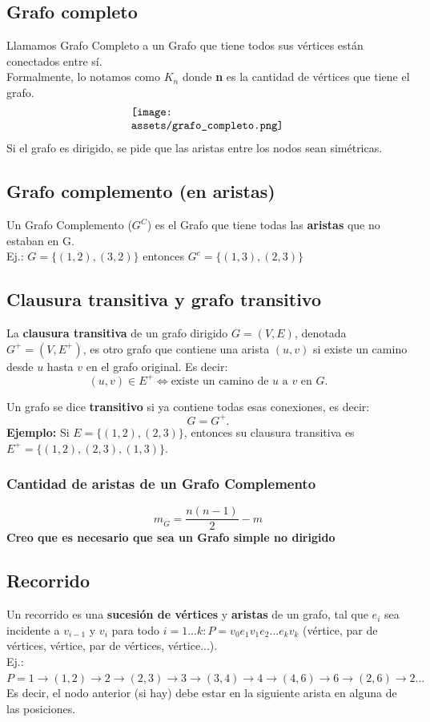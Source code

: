 \documentclass[10pt,a4paper]{article}
\begin{document}
\subsection*{Grafo completo}
Llamamos Grafo Completo a un Grafo que tiene todos sus vértices están conectados entre sí. \\
Formalmente, lo notamos como $K_{n}$ donde \textbf{n} es la cantidad de vértices que tiene el grafo.
\[\begin{minipage}[b]{0.4\textwidth} 
    \texttt{[image: assets/grafo\_completo.png]}
\end{minipage}\]
Si el grafo es dirigido, se pide que las aristas entre los nodos sean simétricas.
\subsection*{Grafo complemento (en aristas)}
Un Grafo Complemento ($G^{C}$) es el Grafo que tiene todas las \textbf{aristas} que no estaban en G. \\
Ej.: $G = \{(1, 2), (3, 2)\}$ entonces $ G^{c} = \{(1, 3), (2, 3)\}$
\subsection*{Clausura transitiva y grafo transitivo}

La \textbf{clausura transitiva} de un grafo dirigido \(G = (V, E)\), denotada \(G^+ = (V, E^+)\), es otro grafo que contiene una arista \((u,v)\) si existe un camino desde \(u\) hasta \(v\) en el grafo original. Es decir:
\[
(u,v) \in E^+ \iff \text{existe un camino de } u \text{ a } v \text{ en } G.
\]

Un grafo se dice \textbf{transitivo} si ya contiene todas esas conexiones, es decir:
\[
G = G^+.
\]
\textbf{Ejemplo:} Si \(E = \{(1,2), (2,3)\}\), entonces su clausura transitiva es \(E^+ = \{(1,2), (2,3), (1,3)\}\).
\subsubsection*{Cantidad de aristas de un Grafo Complemento}
\[m_{\overline{G}} = \frac{n(n-1)}{2} - m\]
\textbf{Creo que es necesario que sea un Grafo simple no dirigido}
\subsection*{Recorrido}
Un recorrido es una \textbf{sucesión de vértices} y \textbf{aristas} de un grafo, tal que $e_{i}$ sea incidente a $v_{i-1}$ y $v_{i}$ para todo $i = 1...k : P = v_{0}e_{1}v_{1}e_{2}...e_{k}v_{k}$ (vértice, par de vértices, vértice, par de vértices, vértice...). \\
Ej.: $P = 1 \rightarrow (1,2) \rightarrow 2 \rightarrow (2,3) \rightarrow 3 \rightarrow (3,4) \rightarrow 4 \rightarrow (4,6) \rightarrow 6 \rightarrow (2,6) \rightarrow 2 ...$ \\
Es decir, el nodo anterior (si hay) debe estar en la siguiente arista en alguna de las posiciones.
\end{document}
